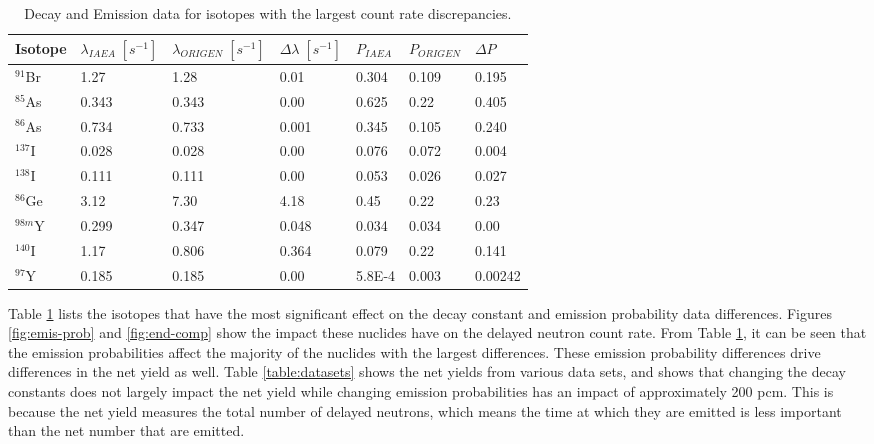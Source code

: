 \documentclass{style/nseJournal}
\begin{document}
\begin{table}[]
\centering
\caption{Decay and Emission data for isotopes with the largest count rate discrepancies.}
\begin{tabular}{|l l l l l l l|} 
 \hline
 Isotope & $\lambda_{IAEA} \; [s^{-1}]$ & $\lambda_{ORIGEN} \; [s^{-1}]$ & $\Delta \lambda \; [s^{-1}]$ & $P_{IAEA}$ & $P_{ORIGEN}$ & $\Delta P$\\
 \hline\hline
     $^{91}$Br & 1.27 & 1.28 & 0.01 & 0.304 & 0.109 & 0.195\\
     $^{85}$As & 0.343 & 0.343 & 0.00 &  0.625 & 0.22 & 0.405\\
     $^{86}$As & 0.734 & 0.733 & 0.001& 0.345 & 0.105 & 0.240\\
     $^{137}$I & 0.028 & 0.028 & 0.00 & 0.076 & 0.072 & 0.004 \\
     $^{138}$I & 0.111 & 0.111 & 0.00 & 0.053 & 0.026 & 0.027 \\
     $^{86}$Ge & 3.12 & 7.30 & 4.18 & 0.45 & 0.22 & 0.23\\
     $^{98m}$Y & 0.299 & 0.347 & 0.048 & 0.034 & 0.034 & 0.00\\
     $^{140}$I & 1.17 & 0.806 & 0.364 & 0.079 & 0.22 & 0.141\\
     $^{97}$Y & 0.185 & 0.185 & 0.00 & 5.8E-4 & 0.003 & 0.00242\\
 \hline
\end{tabular}
\label{table:worst-isos}
\end{table}

Table \ref{table:worst-isos} lists the isotopes that have the most significant effect on the decay constant and emission probability data differences.
Figures \ref{fig:emis-prob} and \ref{fig:end-comp} show the impact these nuclides have on the delayed neutron count rate. 
From Table \ref{table:worst-isos}, it can be seen that the emission probabilities affect the majority of the nuclides with the largest differences.
These emission probability differences drive differences in the net yield as well.
Table \ref{table:datasets} shows the net yields from various data sets, and shows that changing the decay constants does not largely impact the net yield while changing emission probabilities has an impact of approximately 200 pcm.
This is because the net yield measures the total number of delayed neutrons, which means the time at which they are emitted is less important than the net number that are emitted.
\end{document}
